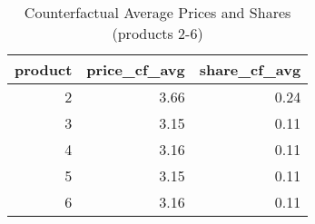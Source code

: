 \begin{table}[ht]
\centering
\begin{tabular}{rrr}
  \hline
product & price\_cf\_avg & share\_cf\_avg \\ 
  \hline
  2 & 3.66 & 0.24 \\ 
    3 & 3.15 & 0.11 \\ 
    4 & 3.16 & 0.11 \\ 
    5 & 3.15 & 0.11 \\ 
    6 & 3.16 & 0.11 \\ 
   \hline
\end{tabular}
\caption{Counterfactual Average Prices and Shares (products 2-6)} 
\label{tab:cf}
\end{table}

